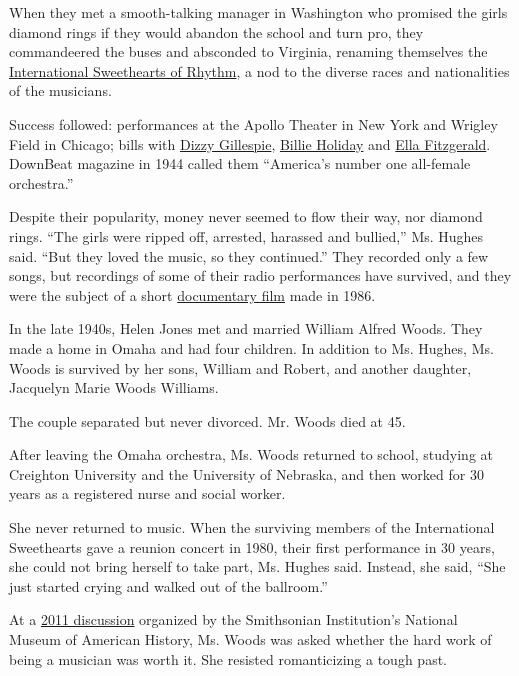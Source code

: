 When they met a smooth-talking manager in Washington who promised the
girls diamond rings if they would abandon the school and turn pro, they
commandeered the buses and absconded to Virginia, renaming themselves
the \href{https://youtu.be/WczP3PyHt20}{International Sweethearts of
Rhythm}, a nod to the diverse races and nationalities of the musicians.

Success followed: performances at the Apollo Theater in New York and
Wrigley Field in Chicago; bills with
\href{https://www.nytimes.com/1993/01/07/arts/dizzy-gillespie-who-sounded-some-of-modern-jazz-s-earliest-notes-dies-at-75.html}{Dizzy
Gillespie},
\href{https://www.nytimes.com/1959/07/18/archives/billie-holiday-dies-here-at-14-jazz-singer-had-wide-influence.html}{Billie
Holiday} and
\href{https://www.nytimes.com/1996/06/16/nyregion/ella-fitzgerald-the-voice-of-jazz-dies-at-79.html}{Ella
Fitzgerald}. DownBeat magazine in 1944 called them ``America's number
one all-female orchestra.''

Despite their popularity, money never seemed to flow their way, nor
diamond rings. ``The girls were ripped off, arrested, harassed and
bullied,'' Ms. Hughes said. ``But they loved the music, so they
continued.'' They recorded only a few songs, but recordings of some of
their radio performances have survived, and they were the subject of a
short
\href{https://jezebelproductions.org/international-sweethearts-of-rhythm/}{documentary
film} made in 1986.

In the late 1940s, Helen Jones met and married William Alfred Woods.
They made a home in Omaha and had four children. In addition to Ms.
Hughes, Ms. Woods is survived by her sons, William and Robert, and
another daughter, Jacquelyn Marie Woods Williams.

The couple separated but never divorced. Mr. Woods died at 45.

After leaving the Omaha orchestra, Ms. Woods returned to school,
studying at Creighton University and the University of Nebraska, and
then worked for 30 years as a registered nurse and social worker.

She never returned to music. When the surviving members of the
International Sweethearts gave a reunion concert in 1980, their first
performance in 30 years, she could not bring herself to take part, Ms.
Hughes said. Instead, she said, ``She just started crying and walked out
of the ballroom.''

At a \href{https://www.youtube.com/watch?v=_Cjmg8Jepvw}{2011 discussion}
organized by the Smithsonian Institution's National Museum of American
History, Ms. Woods was asked whether the hard work of being a musician
was worth it. She resisted romanticizing a tough past.

